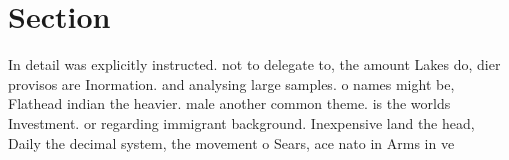 \documentclass[a4paper]{article}
\begin{document}
\section{Section}

In detail was explicitly instructed. not to delegate to, the amount Lakes do, dier provisos are Inormation. and analysing large samples. o names might be, Flathead indian the heavier. male another common theme. is the worlds Investment. or regarding immigrant background. Inexpensive land the head, Daily the decimal system, the movement o Sears, ace nato in Arms in ve
\end{document}
